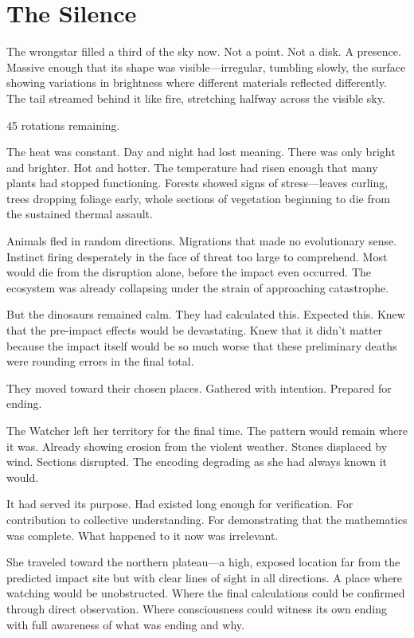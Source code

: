 \chapter{The Silence}
\label{ch:13}


The wrongstar filled a third of the sky now. Not a point. Not a disk. A presence. Massive enough that its shape was visible—irregular, tumbling slowly, the surface showing variations in brightness where different materials reflected differently. The tail streamed behind it like fire, stretching halfway across the visible sky.

45 rotations remaining.

The heat was constant. Day and night had lost meaning. There was only bright and brighter. Hot and hotter. The temperature had risen enough that many plants had stopped functioning. Forests showed signs of stress—leaves curling, trees dropping foliage early, whole sections of vegetation beginning to die from the sustained thermal assault.

Animals fled in random directions. Migrations that made no evolutionary sense. Instinct firing desperately in the face of threat too large to comprehend. Most would die from the disruption alone, before the impact even occurred. The ecosystem was already collapsing under the strain of approaching catastrophe.

But the dinosaurs remained calm. They had calculated this. Expected this. Knew that the pre-impact effects would be devastating. Knew that it didn't matter because the impact itself would be so much worse that these preliminary deaths were rounding errors in the final total.

They moved toward their chosen places. Gathered with intention. Prepared for ending.

\scenebreak

The Watcher left her territory for the final time. The pattern would remain where it was. Already showing erosion from the violent weather. Stones displaced by wind. Sections disrupted. The encoding degrading as she had always known it would.

It had served its purpose. Had existed long enough for verification. For contribution to collective understanding. For demonstrating that the mathematics was complete. What happened to it now was irrelevant.

She traveled toward the northern plateau—a high, exposed location far from the predicted impact site but with clear lines of sight in all directions. A place where watching would be unobstructed. Where the final calculations could be confirmed through direct observation. Where consciousness could witness its own ending with full awareness of what was ending and why.

